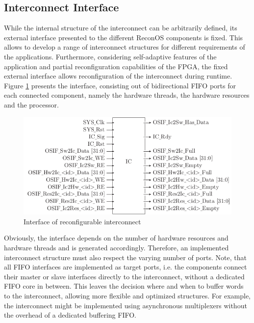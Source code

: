 \subsection{Interconnect Interface}
While the internal structure of the interconnect can be arbitrarily defined,
its external interface presented to the different ReconOS components is fixed.
This allows to develop a range of interconnect structures for different
requirements of the applications. Furthermore, considering self-adaptive
features of the application and partial reconfiguration capabilities of the
\ac{FPGA}, the fixed external interface allows reconfiguration of the
interconnect during runtime. Figure \ref{fig:interconnect_if} presents the
interface, consisting out of bidirectional \ac{FIFO} ports for each connected
component, namely the hardware threads, the hardware resources and the
processor.
\begin{figure}
	\centering
	\includegraphics{../figures/interconnect_if}
	\caption{Interface of reconfigurable interconnect}
	\label{fig:interconnect_if}
\end{figure}
Obviously, the interface depends on the number of hardware resources and
hardware threads and is generated accordingly. Therefore, an implemented
interconnect structure must also respect the varying number of ports. Note,
that all \ac{FIFO} interfaces are implemented as target ports, i.e. the
components connect their master or slave interfaces directly to the
interconnect, without a dedicated \ac{FIFO} core in between. This leaves the
decision where and when to buffer words to the interconnect, allowing more
flexible and optimized structures. For example, the interconnect might be
implemented using asynchronous multiplexers without the overhead of a
dedicated buffering \ac{FIFO}.

